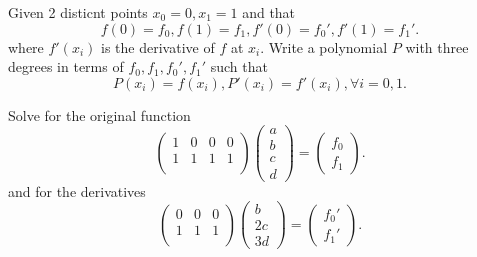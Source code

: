 \documentclass[5pt, a4paper]{article}
\begin{document}
\begin{tcolorbox}[title=Question 3]
    Given 2 disticnt points $x_0=0, x_1=1$ and that \[
    f(0) = f_0, f(1) = f_1, f'(0) =  f_0', f'(1) = f_1'
    .\] 
    where $f'(x_{i})$ is the derivative of $f$ at $x_{i}$.
    Write a polynomial $P$ with three degrees in terms of  $f_0,f_1,f_0',f_1'$
    such that \[
    P(x_{i}) = f(x_{i}), P'(x_{i}) = f'(x_{i}), \forall i = 0,1
    .\] 
\end{tcolorbox}
Solve for the original function \[
    \begin{pmatrix} 
        1 & 0 & 0 & 0 \\
        1 & 1 & 1 & 1\\
\end{pmatrix} 
\begin{pmatrix} a \\ b \\ c \\ d \end{pmatrix} 
= \begin{pmatrix} f_0 \\ f_1 \end{pmatrix} 
.\] 
and for the derivatives \[
    \begin{pmatrix} 
        0 & 0 & 0 \\
        1 & 1 & 1\\
    \end{pmatrix} 
    \begin{pmatrix} b \\ 2c \\ 3d \end{pmatrix} 
    =  \begin{pmatrix} f_0' \\ f_1' \end{pmatrix} 
.\] 
\end{document}

